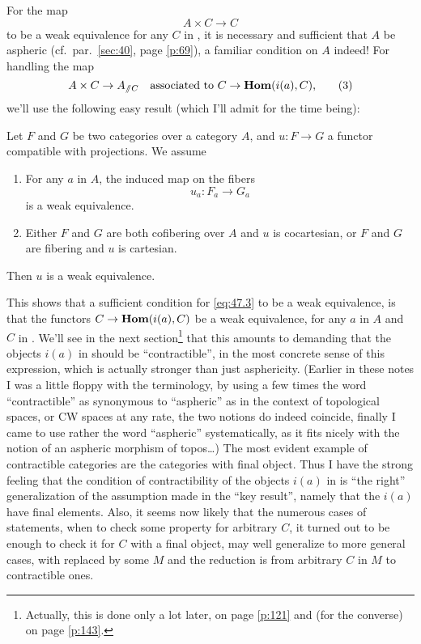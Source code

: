 For the map
\begin{equation}
  \label{eq:47.2}
  A\times C\to C
  \tag{2}
\end{equation}
to be a weak equivalence for any $C$ in \Cat, it is necessary and
sufficient that $A$ be aspheric (cf.\ par.\ \ref{sec:40}, page
\ref{p:69}), a familiar condition on $A$ indeed! For handling the map
\begin{equation}
  \label{eq:47.3}
  A\times C\to A_{\sslash C}\quad\text{associated to $C\to\operatorname{\mathbf{Hom}}(i(a),C)$,}
  \tag{3}
\end{equation}
we'll use the following easy result (which I'll admit for the time
being):
\begin{proposition}
  Let $F$ and $G$ be two categories over a category $A$\kern1pt, and $u:F\to
  G$ a functor compatible with projections. We assume
  \begin{enumerate}[label=\alph*),font=\normalfont]
  \item\label{it:47.a}
    For any $a$ in $A$\kern1pt, the induced map on the fibers
    \[u_a : F_a \to G_a\]
    is a weak equivalence.
  \item\label{it:47.b}
    Either $F$ and $G$ are both cofibering over $A$ and $u$ is
    cocartesian, or $F$ and $G$ are fibering and $u$ is cartesian.
  \end{enumerate}
  Then $u$ is a weak equivalence.
\end{proposition}
This shows that a sufficient condition for \eqref{eq:47.3} to be a
weak equivalence, is that the functors $C\to\operatorname{\mathbf{Hom}}(i(a),C)$ be a weak
equivalence, for any $a$ in $A$ and $C$ in \Cat. We'll see in the next
section\footnote{ Actually, this is done only a lot later, on page
  \ref{p:121} and (for the converse) on page \ref{p:143}.} that this
amounts to demanding that the objects $i(a)$ in \Cat{} should be
``contractible'', in the most concrete sense of this expression, which
is actually stronger than just asphericity. (Earlier in these notes I
was a little floppy with the terminology, by using a few times the
word ``contractible'' as synonymous to ``aspheric'' as in
the context of topological spaces, or CW spaces at any rate, the two
notions do indeed coincide, finally I came to use rather the word
``aspheric'' systematically, as it fits nicely with the notion of an
aspheric morphism of topos\ldots) The most evident example of
contractible categories are the categories with final object. Thus I
have the strong feeling that the condition of contractibility of the
objects $i(a)$ in \Cat{} is ``the right'' generalization of the
assumption made in the ``key result'', namely that the $i(a)$ have
final elements. Also, it seems now likely that the numerous cases of
statements, when to check some property for arbitrary $C$, it turned
out to be enough to check it for $C$ with a final object, may well
generalize to more general cases, with \Cat{} replaced by some $M$ and
the reduction is from arbitrary $C$ in $M$ to contractible ones.

